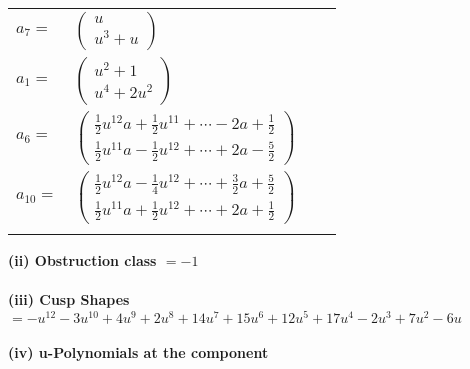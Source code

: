 \documentclass[1p]{elsarticle_modified}
\theoremstyle{definition}
\begin{document}
\begin{tabular}{m{7pt} m{180pt} m{7pt} m{180pt} }
\flushright $a_{7}=$&$\begin{pmatrix}u\\u^3+u\end{pmatrix}$ \\
\flushright $a_{1}=$&$\begin{pmatrix}u^2+1\\u^4+2 u^2\end{pmatrix}$ \\
\flushright $a_{6}=$&$\begin{pmatrix}\frac{1}{2} u^{12} a+\frac{1}{2} u^{11}+\cdots-2 a+\frac{1}{2}\\\frac{1}{2} u^{11} a-\frac{1}{2} u^{12}+\cdots+2 a-\frac{5}{2}\end{pmatrix}$ \\
\flushright $a_{10}=$&$\begin{pmatrix}\frac{1}{2} u^{12} a-\frac{1}{4} u^{12}+\cdots+\frac{3}{2} a+\frac{5}{2}\\\frac{1}{2} u^{11} a+\frac{1}{2} u^{12}+\cdots+2 a+\frac{1}{2}\end{pmatrix}$\\&\end{tabular}
\flushleft \textbf{(ii) Obstruction class $= -1$}\\~\\
\flushleft \textbf{(iii) Cusp Shapes $= - u^{12}-3 u^{10}+4 u^9+2 u^8+14 u^7+15 u^6+12 u^5+17 u^4-2 u^3+7 u^2-6 u$}\\~\\
\newpage\renewcommand{\arraystretch}{1}
\flushleft \textbf{(iv) u-Polynomials at the component}\newline \\
\end{document}
